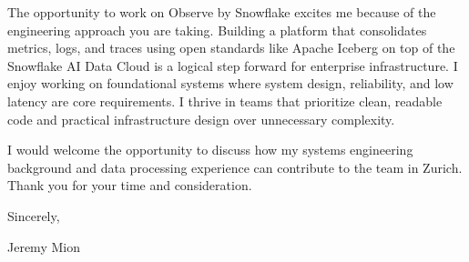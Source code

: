\documentclass[11pt, a4paper]{article}
\begin{document}
The opportunity to work on Observe by Snowflake excites me because of the engineering approach you are taking. Building a platform that consolidates metrics, logs, and traces using open standards like Apache Iceberg on top of the Snowflake AI Data Cloud is a logical step forward for enterprise infrastructure. I enjoy working on foundational systems where system design, reliability, and low latency are core requirements. I thrive in teams that prioritize clean, readable code and practical infrastructure design over unnecessary complexity.

I would welcome the opportunity to discuss how my systems engineering background and data processing experience can contribute to the team in Zurich. Thank you for your time and consideration.

Sincerely,

\vspace{20pt}

Jeremy Mion
\end{document}
